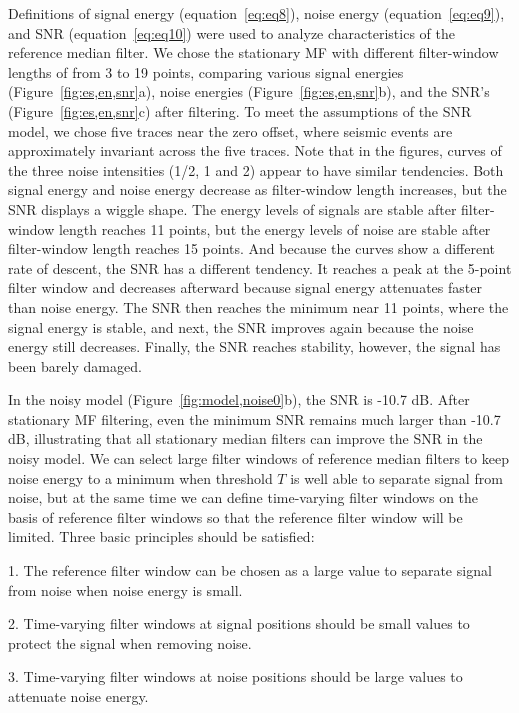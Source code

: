 Definitions of signal energy (equation~\ref{eq:eq8}), noise energy 
(equation~\ref{eq:eq9}), and SNR (equation~\ref{eq:eq10}) were used to analyze 
characteristics of the reference median filter. We chose the stationary MF with 
different filter-window lengths of from 3 to 19 points, comparing various signal 
energies (Figure~\ref{fig:es,en,snr}a), noise energies (Figure~\ref{fig:es,en,snr}b), and the SNR's 
(Figure~\ref{fig:es,en,snr}c) after filtering. To meet the assumptions 
of the SNR model, we chose five traces near the zero offset, where seismic events 
are approximately invariant across the five traces. Note that in the 
figures, curves of the 
three noise intensities (1/2, 1 and 2) appear to have similar tendencies. Both 
signal energy and noise energy decrease as filter-window length increases, but the 
SNR displays a wiggle shape. The energy levels 
of signals are stable after filter-window length reaches 11 points, but the energy levels of noise 
are stable after filter-window length reaches 15 points. And because the curves show a different 
rate of descent, the SNR has a different tendency. It reaches 
a peak at the 5-point filter window and decreases afterward 
because signal energy attenuates faster than noise energy. The SNR then reaches the 
minimum near 11 points, where the signal energy is stable, and next, the SNR improves 
again because the noise energy still decreases. Finally, the SNR reaches stability, 
however, the signal has been barely damaged.

In the noisy model 
(Figure~\ref{fig:model,noise0}b), the SNR is -10.7 dB. After stationary MF filtering, 
even the minimum SNR remains much larger than -10.7 dB, illustrating that all 
stationary median filters can improve the SNR in the noisy model. 
We can select large filter windows of reference median 
filters to keep noise energy to a minimum when threshold $T$ is well able to separate 
signal from noise, but at the same time we can define time-varying filter windows on 
the basis of reference filter windows so that the reference filter window will be 
limited. Three basic principles should be satisfied:

1. The reference filter window can be chosen as a large value to separate signal from 
noise when noise energy is small.

2. Time-varying filter windows at signal positions should be small values to 
protect the signal when removing noise.

3. Time-varying filter windows at noise positions should be large values to attenuate 
noise energy.

